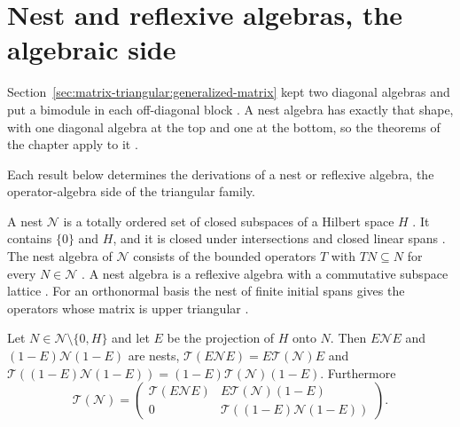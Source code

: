 \section{Nest and reflexive algebras, the algebraic side}\label{sec:matrix-triangular:nest-algebraic}

Section~\ref{sec:matrix-triangular:generalized-matrix} kept two diagonal
algebras and put a bimodule in each off-diagonal block
\cite[p.~2720]{DuWang2012}. A nest algebra has exactly that shape, with one
diagonal algebra at the top and one at the bottom, so the theorems of the
chapter apply to it \cite[Proposition~19, p.~308]{Cheung2003}.

Each result below determines the derivations of a nest or reflexive algebra,
the operator-algebra side of the triangular family. %

A nest $\mathcal{N}$ is a totally ordered set of closed subspaces of a Hilbert
space $H$ \cite[p.~308]{Cheung2003}. It contains $\{0\}$ and $H$, and it is
closed under intersections and closed linear spans \cite[p.~308]{Cheung2003}.
The nest algebra of $\mathcal{N}$ consists of the bounded operators $T$ with
$TN\subseteq N$ for every $N\in\mathcal{N}$ \cite[p.~308]{Cheung2003}. A nest
algebra is a reflexive algebra with a commutative subspace lattice
\cite[p.~156]{Christensen1977}. For an orthonormal basis the nest of finite
initial spans gives the operators whose matrix is upper triangular
\cite[p.~308]{Cheung2003}.

\begin{proposition}\label{prop:nest:triangular}
Let $N\in\mathcal{N}\setminus\{0,H\}$ and let $E$ be the projection of $H$
onto $N$. Then $E\mathcal{N}E$ and $(1-E)\mathcal{N}(1-E)$ are nests,
$\mathcal{T}(E\mathcal{N}E)=E\mathcal{T}(\mathcal{N})E$ and
$\mathcal{T}((1-E)\mathcal{N}(1-E))=(1-E)\mathcal{T}(\mathcal{N})(1-E)$.
Furthermore
\[
\mathcal{T}(\mathcal{N})=
\begin{pmatrix}
\mathcal{T}(E\mathcal{N}E) & E\mathcal{T}(\mathcal{N})(1-E)\\
0 & \mathcal{T}((1-E)\mathcal{N}(1-E))
\end{pmatrix}.
\]
\end{proposition}

